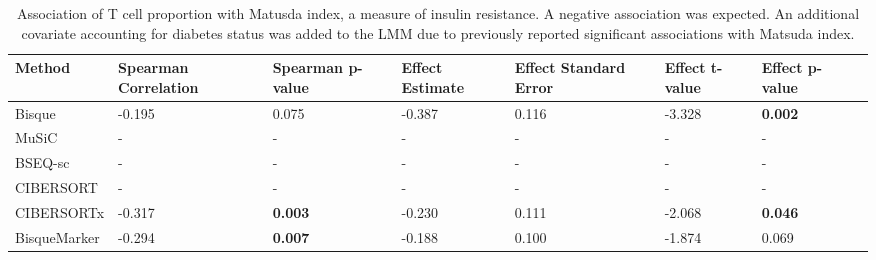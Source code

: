 \begin{table}
    \scriptsize
    \centering
    \begin{tabularx}{\textwidth}{|L|L|L|L|L|L|L|X|}
    \hline
    \textbf{Method} & \textbf{Spearman Correlation} & \textbf{Spearman p-value} & \textbf{Effect Estimate} & \textbf{Effect Standard Error} & \textbf{Effect t-value} & \textbf{Effect p-value}   \\ \hline
    Bisque & -0.195 & 0.075 & -0.387 & 0.116 & -3.328 &  \textbf{0.002}  \\ \hline
    MuSiC & - & - & - & - & - & -  \\ \hline
    BSEQ-sc & - & - & - & - & - & -  \\ \hline
    CIBERSORT & - & - & - & - & - & - \\ \hline
    CIBERSORTx & -0.317 & \textbf{0.003} & -0.230 & 0.111 & -2.068 & \textbf{0.046} \\ \hline
    BisqueMarker & -0.294 & \textbf{0.007} & -0.188 & 0.100 & -1.874 & 0.069  \\ \hline    
    \end{tabularx}
    \caption{Association of T cell proportion with Matusda index, a measure of insulin resistance. A negative association was expected. An additional covariate accounting for diabetes status was added to the LMM due to previously reported significant associations with Matsuda index.}
    \label{table:suptable2.1c}
\end{table}

